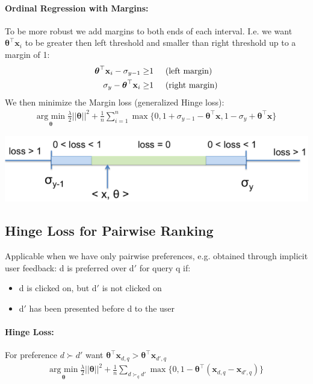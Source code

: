 \documentclass[a4paper,11pt]{article}
\newcommand{\btheta}{\boldsymbol \theta}
\begin{document}
\begin{multicols}{2}
\paragraph{Ordinal Regression with Margins:} To be more robust we add margins to both ends of each interval. I.e. we want $\btheta^{\top} \mathbf{x}_i$ to be greater then left threshold and smaller than right threshold up to a margin of 1:
\begin{align*}
  \btheta^{\top} \mathbf{x}_i - \sigma_{y -1} \geq& 1  \hspace{0.5cm} \text{(left margin)} \\
  \sigma_{y} - \btheta^{\top} \mathbf{x}_i \geq& 1  \hspace{0.5cm} \text{(right margin)}
\end{align*}
We then minimize the Margin loss (generalized Hinge loss):
\begin{align*}
  \underset{\btheta}{\text{arg min}} \; \frac{\lambda}{2}||\btheta||^2 + \frac{1}{n} \sum_{i = 1}^n \max\{0, 1 + \sigma_{y -1} - \btheta^{\top} \mathbf{x}, 1 - \sigma_y + \btheta^{\top} \mathbf{x}\}
\end{align*}
\begin{center}
  \includegraphics[width=0.8\columnwidth]{ordinal_regression.png}
\end{center}

\subsection{Hinge Loss for Pairwise Ranking}
Applicable when we have only pairwise preferences, e.g. obtained through implicit user feedback:
d is preferred over d$'$ for query q if:\\
\begin{itemize}
  \item d is clicked on, but d$'$ is not clicked on
  \item d$'$ has been presented before d to the user
\end{itemize}

\paragraph{Hinge Loss:}
For preference $d \succ d'$ want $\btheta^{\top} \mathbf{x}_{d, q} > \btheta^{\top} \mathbf{x}_{d', q}$
\begin{align*}
  \underset{\btheta}{\text{arg min}} \; \frac{\lambda}{2}||\btheta||^2 + \frac{1}{n} \sum_{d \succ_q d'} \max\{0, 1 - \btheta^{\top}(\mathbf{x}_{d,q} - \mathbf{x}_{d', q}) \}
\end{align*}


\end{multicols}
\end{document}
